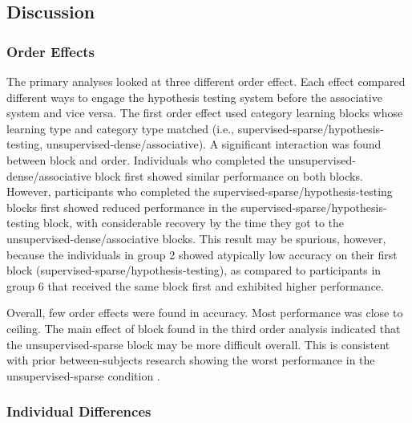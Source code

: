 \documentclass[../dissertation.tex]{subfiles}
\begin{document}
\subsection{Discussion}
\subsubsection{Order Effects}
	The primary analyses looked at three different order effect. Each effect compared different ways to engage the hypothesis testing system before the associative system and vice versa. The first order effect used category learning blocks whose learning type and category type matched (i.e., supervised-sparse/hypothesis-testing, unsupervised-dense/associative). A significant interaction was found between block and order. Individuals who completed the unsupervised-dense/associative block first showed similar performance on both blocks. However, participants who completed the supervised-sparse/hypothesis-testing blocks first showed reduced performance in the supervised-sparse/hypothesis-testing block, with considerable recovery by the time they got to the unsupervised-dense/associative blocks. This result may be spurious, however, because the individuals in group 2 showed atypically low accuracy on their first block (supervised-sparse/hypothesis-testing), as compared to participants in group 6 that received the same block first and exhibited higher performance. \par
	Overall, few order effects were found in accuracy. Most performance was close to ceiling. The main effect of block found in the third order analysis indicated that the unsupervised-sparse block may be more difficult overall. This is consistent with prior between-subjects research showing the worst performance in the unsupervised-sparse condition \citep{Kloos2008}.
\subsubsection{Individual Differences}
\end{document}
